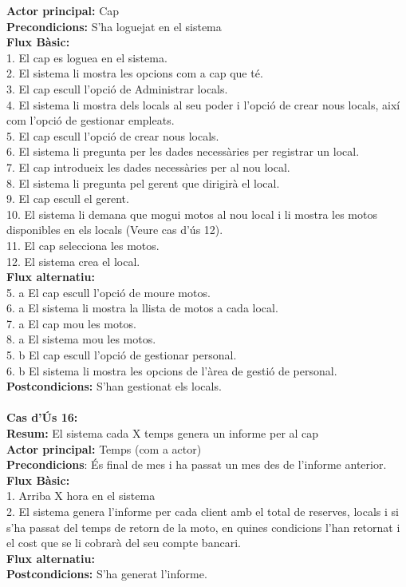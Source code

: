 \documentclass{article}
\begin{document}
\textbf{Actor principal:} Cap\\
\textbf{Precondicions:} S'ha loguejat en el sistema\\
\textbf{Flux B\`asic:}\\
1. El cap es loguea en el sistema.\\
2. El sistema li mostra les opcions com a cap que t\'e.\\
3. El cap escull l'opci\'o de Administrar locals.\\
4. El sistema li mostra dels locals al seu poder i l'opci\'o de crear nous locals, aix\'i com l'opci\'o de gestionar empleats.\\
5. El cap escull l'opci\'o de crear nous locals.\\
6. El sistema li pregunta per les dades necess\`aries per registrar un local.\\
7. El cap introdueix les dades necess\`aries per al nou local.\\
8. El sistema li pregunta pel gerent que dirigir\`a el local.\\
9. El cap escull el gerent.\\
10. El sistema li demana que mogui motos al nou local i li mostra les motos disponibles en els locals (Veure cas d'\'us 12).\\
11. El cap selecciona les motos.\\
12. El sistema crea\textbf{} el local.\\
\textbf{Flux alternatiu:\\}
5. a El cap escull l'opci\'o de moure motos.\\
6. a El sistema li mostra la llista de motos a cada local.\\
7. a El cap mou les motos.\\
8. a El sistema mou les motos.\\
5. b El cap escull l'opci\'o de gestionar personal.\\
6. b El sistema li mostra les opcions de l'\`area de gesti\'o de personal.\\
\textbf{Postcondicions:} S'han gestionat els locals.\\\\
\textbf{Cas d'\'Us 16:}\\
\textbf{Resum:} El sistema cada X temps genera un informe per al cap\\
\textbf{Actor principal:} Temps (com a actor)\\
\textbf{Precondicions}: \'Es final de mes i ha passat un mes des de l'informe anterior.\\
\textbf{Flux B\`asic:}\\
1. Arriba X hora en el sistema\\
2. El sistema genera l'informe per cada client amb el total de reserves, locals i si s'ha passat del temps de retorn de la moto, en quines condicions l'han retornat i el cost que se li cobrar\`a del seu compte bancari.\\
\textbf{Flux alternatiu:\\}
\textbf{Postcondicions:} S'ha generat l'informe.\\
\end{document}
